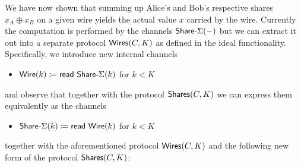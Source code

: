 We have now shown that summing up Alice's and Bob's respective shares $x_A \oplus x_B$ on a given wire yields the actual value $x$ carried by the wire. Currently the computation is performed by the channels $\mathsf{Share}\textsf{-}\Sigma(-)$ but we can extract it out into a separate protocol $\mathsf{Wires}(C,K)$ as defined in the ideal functionality. Specifically, we introduce new internal channels
\begin{itemize}
\item $\mathsf{Wire}(k) \coloneqq \mathsf{read} \ \mathsf{Share}\textsf{-}\Sigma(k)$ for $k < K$
\end{itemize}
and observe that together with the protocol $\mathsf{Shares}(C,K)$ we can express them equivalently as the channels
\begin{itemize}
\item $\mathsf{Share}\textsf{-}\Sigma(k) \coloneqq \mathsf{read} \ \mathsf{Wire}(k)$ for $k < K$
\end{itemize}
together with the aforementioned protocol $\mathsf{Wires}(C,K)$ and the following new form of the protocol $\mathsf{Shares}(C,K)$:

